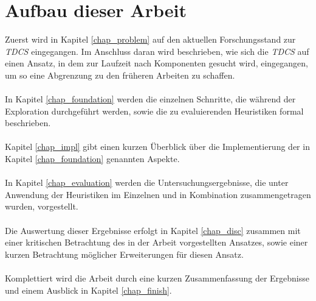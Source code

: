 \section{Aufbau dieser Arbeit}
Zuerst wird in Kapitel \ref{chap_problem} auf den aktuellen Forschungsstand zur \emph{TDCS} eingegangen. Im Anschluss daran wird beschrieben, wie sich die \emph{TDCS} auf einen Ansatz, in dem zur Laufzeit nach Komponenten gesucht wird, eingegangen, um so eine Abgrenzung zu den früheren Arbeiten zu schaffen.
\\\\
In Kapitel \ref{chap_foundation} werden die einzelnen Schnritte, die während der Exploration durchgeführt werden, sowie die zu evaluierenden Heuristiken formal beschrieben.
\\\\
Kapitel \ref{chap_impl} gibt einen kurzen Überblick über die Implementierung der in Kapitel \ref{chap_foundation} genannten Aspekte.
\\\\
In Kapitel \ref{chap_evaluation} werden die Untersuchungsergebnisse, die unter Anwendung der Heuristiken im Einzelnen und in Kombination zusammengetragen wurden, vorgestellt. 
\\\\
Die Auswertung dieser Ergebnisse erfolgt in Kapitel \ref{chap_disc} zusammen mit einer kritischen Betrachtung des in der Arbeit vorgestellten Ansatzes, sowie einer kurzen Betrachtung möglicher Erweiterungen für diesen Ansatz.
\\\\
Komplettiert wird die Arbeit durch eine kurzen Zusammenfassung der Ergebnisse und einem Ausblick in Kapitel \ref{chap_finish}.
%